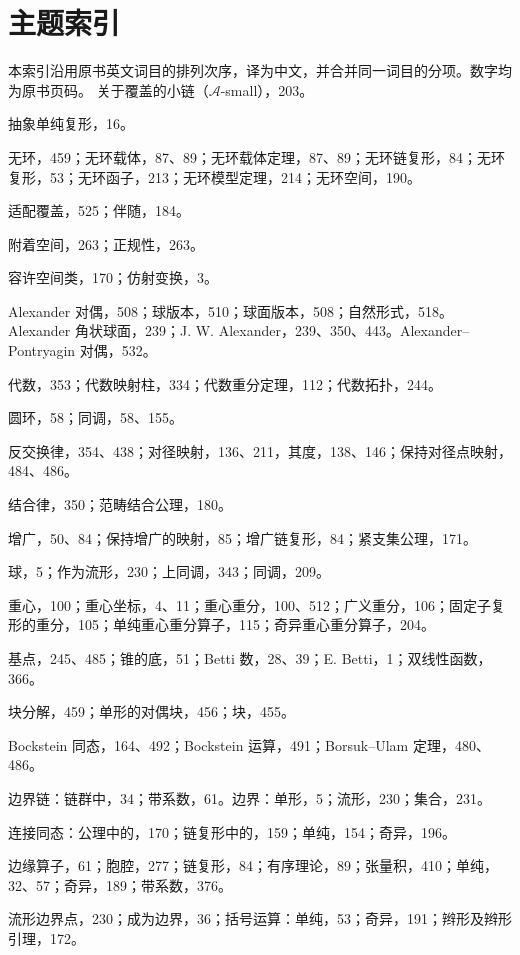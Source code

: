 \chapter*{主题索引}
本索引沿用原书英文词目的排列次序，译为中文，并合并同一词目的分项。数字均为原书页码。
\begingroup\small\setlength{\parindent}{0pt}\setlength{\parskip}{3pt}
关于覆盖的小链（$\mathcal A$-small），203。

抽象单纯复形，16。

无环，459；无环载体，87、89；无环载体定理，87、89；无环链复形，84；无环复形，53；无环函子，213；无环模型定理，214；无环空间，190。

适配覆盖，525；伴随，184。

附着空间，263；正规性，263。

容许空间类，170；仿射变换，3。

Alexander 对偶，508；球版本，510；球面版本，508；自然形式，518。Alexander 角状球面，239；J. W. Alexander，239、350、443。Alexander--Pontryagin 对偶，532。

代数，353；代数映射柱，334；代数重分定理，112；代数拓扑，244。

圆环，58；同调，58、155。

反交换律，354、438；对径映射，136、211，其度，138、146；保持对径点映射，484、486。

结合律，350；范畴结合公理，180。

增广，50、84；保持增广的映射，85；增广链复形，84；紧支集公理，171。

球，5；作为流形，230；上同调，343；同调，209。

重心，100；重心坐标，4、11；重心重分，100、512；广义重分，106；固定子复形的重分，105；单纯重心重分算子，115；奇异重心重分算子，204。

基点，245、485；锥的底，51；Betti 数，28、39；E. Betti，1；双线性函数，366。

块分解，459；单形的对偶块，456；块，455。

Bockstein 同态，164、492；Bockstein 运算，491；Borsuk--Ulam 定理，480、486。

边界链：链群中，34；带系数，61。边界：单形，5；流形，230；集合，231。

连接同态：公理中的，170；链复形中的，159；单纯，154；奇异，196。

边缘算子，61；胞腔，277；链复形，84；有序理论，89；张量积，410；单纯，32、57；奇异，189；带系数，376。

流形边界点，230；成为边界，36；括号运算：单纯，53；奇异，191；辫形及辫形引理，172。

